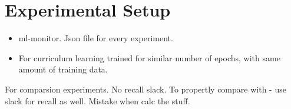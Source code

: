 \section{Experimental Setup}
\label{sec:experimentalSetup}
\todo[inline]{}
\begin{itemize}
\item ml-monitor. Json file for every experiment.
\item For curriculum learning trained for similar number of epochs, with same amount of training data.
\end{itemize}

For comparsion experiments. No recall slack.
To propertly compare with - use slack for recall as well. Mistake when calc the stuff.